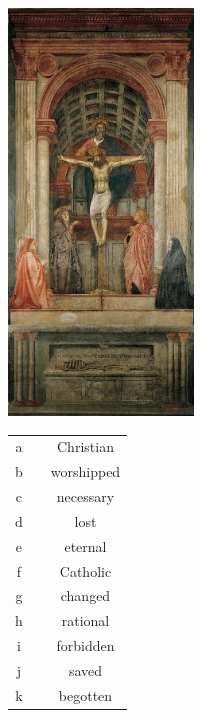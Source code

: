 \documentclass[12pt]{article} %
\begin{document}
\begin{Huge}
\begin{center}

\includegraphics[height=4.25in]{Masaccio-Trinity.jpg}

\vspace{0.25in}

\begin{tabular}{ c c c }
 a & \hspace{10em} & Christian \\ 
 b &  & worshipped \\  
 c &  & necessary \\ 
 d &  & lost \\
 e &  & eternal \\
 f &  & Catholic \\
 g &  & changed \\
 h &  & rational \\
 i &  & forbidden \\
 j &  & saved \\
 k &  & begotten
\end{tabular}
\end{center}
\end{Huge}
\end{document}
